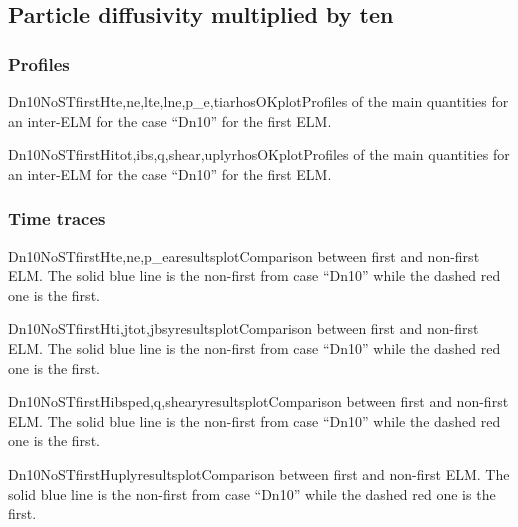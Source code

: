 \subsection{Particle diffusivity multiplied by ten}\label{sec:app:graphs:recovery:first:Dn10}
\subsubsection{Profiles}\label{sec:app:graphs:recovery:first:Dn10:profiles}
\begin{AllFigs}{Dn10NoSTfirst}{H}{}{te,ne,lte,lne,p_e,ti}{a}{rhosOKplot}{Profiles of the main quantities for an inter-ELM for the case ``Dn10'' for the first ELM.}
\end{AllFigs}

\begin{AllFigs}{Dn10NoSTfirst}{H}{}{itot,ibs,q,shear,upl}{y}{rhosOKplot}{Profiles of the main quantities for an inter-ELM for the case ``Dn10'' for the first ELM.}
\end{AllFigs}
\subsubsection{Time traces}\label{sec:app:graphs:recovery:first:Dn10:traces}
\begin{AllFigs}{Dn10NoSTfirst}{H}{}{te,ne,p_e}{a}{resultsplot}{Comparison between first and non-first ELM. The solid blue line is the non-first from case ``Dn10'' while the dashed red one is the first.}
\end{AllFigs}

\begin{AllFigs}{Dn10NoSTfirst}{H}{}{ti,jtot,jbs}{y}{resultsplot}{Comparison between first and non-first ELM. The solid blue line is the non-first from case ``Dn10'' while the dashed red one is the first.}
\end{AllFigs}

\begin{AllFigs}{Dn10NoSTfirst}{H}{}{ibsped,q,shear}{y}{resultsplot}{Comparison between first and non-first ELM. The solid blue line is the non-first from case ``Dn10'' while the dashed red one is the first.}
\end{AllFigs}

\begin{AllFigs}{Dn10NoSTfirst}{H}{}{upl}{y}{resultsplot}{Comparison between first and non-first ELM. The solid blue line is the non-first from case ``Dn10'' while the dashed red one is the first.}
\end{AllFigs}
